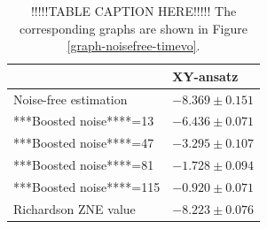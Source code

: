 \begin{table}[h]
\caption{!!!!!TABLE CAPTION HERE!!!!! The corresponding graphs are shown in Figure \ref{graph-noisefree-timevo}.}
\begin{tabular}{@{}ll@{}}
\toprule
  & XY-ansatz\\
\midrule
Noise-free estimation & $-8.369 \pm 0.151$ \\
\midrule
***Boosted noise****=13 & $-6.436 \pm 0.071$ \\
***Boosted noise****=47 & $-3.295 \pm 0.107$ \\
***Boosted noise****=81 & $-1.728 \pm 0.094$ \\
***Boosted noise****=115 & $-0.920 \pm 0.071$ \\
\midrule
Richardson ZNE value & $-8.223 \pm 0.076$ \\
\bottomrule
\end{tabular}
\label{table-noisy-timeevo-richardson}
\end{table}